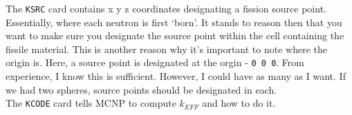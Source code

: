 \documentclass[11pt,a4paper]{article}
\begin{document}
\noindent The \texttt{KSRC} card contains x y z coordinates designating a fission source point. Essentially, where each neutron is first `born'. It stands to reason then that you want to make sure you designate the source point within the cell containing the fissile material. This is another reason why it's important to note where the origin is. Here, a source point is designated at the orgin - \texttt{0 0 0}. From experience, I know this is sufficient. However, I could have as many as
I want. If we had two spheres, source points should be designated in each. \\

\noindent The \texttt{KCODE} card tells MCNP to compute $k_{EFF}$ and how to do it. 
\end{document}
